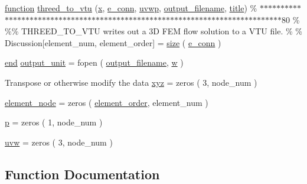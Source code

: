 \begin{DoxyCompactItemize}
\item 
\hyperlink{a00611_a2420833d971716e9bab41cc9fb3abba1}{function} \hyperlink{a00614_ae9816988ffcdbae1aa51d6906e1497ff}{threed\+\_\+to\+\_\+vtu} (\hyperlink{a00605_ac98c3bb25378222646e977292011625f}{x}, \hyperlink{a00611_a4b51eee3b0df698c7db4e3d113502bc0}{e\+\_\+conn}, \hyperlink{a00617_a9c137ebda5c84e833481db1dd6531003}{uvwp}, \hyperlink{a00617_a5934d690c688edbd92210f38fe5855e7}{output\+\_\+filename}, \hyperlink{a00617_a051e403214cb6872ad3fe4e50302a6ee}{title}) \% $\ast$$\ast$$\ast$$\ast$$\ast$$\ast$$\ast$$\ast$$\ast$$\ast$$\ast$$\ast$$\ast$$\ast$$\ast$$\ast$$\ast$$\ast$$\ast$$\ast$$\ast$$\ast$$\ast$$\ast$$\ast$$\ast$$\ast$$\ast$$\ast$$\ast$$\ast$$\ast$$\ast$$\ast$$\ast$$\ast$$\ast$$\ast$$\ast$$\ast$$\ast$$\ast$$\ast$$\ast$$\ast$$\ast$$\ast$$\ast$$\ast$$\ast$$\ast$$\ast$$\ast$$\ast$$\ast$$\ast$$\ast$$\ast$$\ast$$\ast$$\ast$$\ast$$\ast$$\ast$$\ast$$\ast$$\ast$$\ast$$\ast$$\ast$$\ast$$\ast$$\ast$$\ast$$\ast$$\ast$$\ast$80 \% \%\% T\+H\+R\+E\+E\+D\+\_\+\+T\+O\+\_\+\+V\+TU writes out a 3\+D F\+E\+M flow solution to a V\+T\+U file. \% \% Discussion\mbox{[}element\+\_\+num, element\+\_\+order\mbox{]} = \hyperlink{a00611_ad6cb0afbbe6ea4f56407890be2533966}{size} ( \hyperlink{a00611_a4b51eee3b0df698c7db4e3d113502bc0}{e\+\_\+conn} )
\item 
\hyperlink{a00608_afb358f48b1646c750fb9da6c6585be2b}{end} \hyperlink{a00614_a21b113ecd24e6ae8a92fa4a149ad8701}{output\+\_\+unit} = fopen ( \hyperlink{a00617_a5934d690c688edbd92210f38fe5855e7}{output\+\_\+filename}, \textquotesingle{}\hyperlink{a00605_aad57484016654da87125db86f4227ea3}{w}\textquotesingle{} )
\item 
Transpose or otherwise modify the data \hyperlink{a00614_a534015daa58c291db01fdaa6ea94b267}{xyz} = zeros ( 3, node\+\_\+num )
\item 
\hyperlink{a00614_a6e1aca963bebde79824bef83587803b7}{element\+\_\+node} = zeros ( \hyperlink{a00611_aa77ee84ffb15118601acbd018f243edc}{element\+\_\+order}, element\+\_\+num )
\item 
\hyperlink{a00614_ac483f6ce851c9ecd9fb835ff7551737c}{p} = zeros ( 1, node\+\_\+num )
\item 
\hyperlink{a00614_ab72eb62a9262d5c8dbb6ce78753722f7}{uvw} = zeros ( 3, node\+\_\+num )
\end{DoxyCompactItemize}


\subsection{Function Documentation}
\mbox{\label{a00614_a50df015479692caa32ea5ed86939881e}} 
